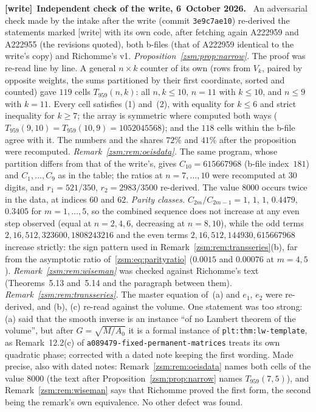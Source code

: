 \documentclass[11pt]{article}
\theoremstyle{definition}\newtheorem{definition}[theorem]{Definition}
\theoremstyle{remark}\newtheorem{remark}[theorem]{Remark}
\newcommand{\file}[1]{\nolinkurl{#1}}
\newenvironment{writenote}[1][]{\par\smallskip\begingroup\small
 \noindent\textbf{[write]}\if\relax\detokenize{#1}\relax\else~\textbf{#1.}\fi\ }%
 {\par\endgroup\smallskip}
\begin{document}
\begin{writenote}[Independent check of the write, 6~October 2026]
An adversarial check made by the intake after the write (commit
\file{3e9c7ae10}) re-derived the statements marked [write] with its own
code, after fetching again A222959 and A222955 (the revisions quoted), both
b-files (that of A222959 identical to the write's copy) and Richomme's v1.
\emph{Proposition~\ref{zsm:prop:narrow}.} The proof was re-read line by
line. A general $n\times k$ counter of its own (rows from $V_k$, paired by
opposite weights, the sums partitioned by their first coordinate, sorted and
counted) gave $119$ cells $T_{959}(n,k)$: all $n,k\le10$, $n=11$ with
$k\le10$, and $n\le9$ with $k=11$. Every cell satisfies (1) and~(2), with
equality for $k\le6$ and strict inequality for $k\ge7$; the array is
symmetric where computed both ways ($T_{959}(9,10)=T_{959}(10,9)=1052045568$);
and the $118$ cells within the b-file agree with it. The numbers and the
shares $72\%$ and $41\%$ after the proposition were recomputed.
\emph{Remark~\ref{zsm:rem:oeisdata}.} The same program, whose partition
differs from that of the write's, gives $C_{10}=615667968$ (b-file
index~$181$) and $C_1,\dots,C_9$ as in the table; the ratios at
$n=7,\dots,10$ were recomputed at $30$ digits, and $r_1=521/350$,
$r_2=2983/3500$ re-derived. The value $8000$ occurs twice in the data, at
indices $60$ and $62$. \emph{Parity classes.} $C_{2m}/C_{2m-1}=1$, $1$, $1$,
$0.4479$, $0.3405$ for $m=1,\dots,5$, so the combined sequence does not
increase at any even step observed (equal at $n=2,4,6$, decreasing at
$n=8,10$), while the odd terms $2,16,512,323600,1808243216$ and the even
terms $2,16,512,144930,615667968$ increase strictly: the sign pattern used
in Remark~\ref{zsm:rem:transseries}(b), far from the asymptotic ratio
of~\eqref{zsm:eq:parityratio} ($0.0015$ and $0.00076$ at $m=4,5$).
\emph{Remark~\ref{zsm:rem:wiseman}} was checked against Richomme's text
(Theorems~5.13 and~5.14 and the paragraph between them).
\emph{Remark~\ref{zsm:rem:transseries}.} The master equation of~(a) and
$e_1$, $e_2$ were re-derived, and (b), (c) re-read against the volume. One
statement was too strong: (a) said that the smooth inverse is an instance
``of no Lambert theorem of the volume'', but after $G=\sqrt{M/A_0}$ it is a
formal instance of \file{plt:thm:lw-template}, as Remark~12.2(c) of
\file{a089479-fixed-permanent-matrices} treats its own quadratic phase;
corrected with a dated note keeping the first wording. Made precise, also
with dated notes: Remark~\ref{zsm:rem:oeisdata} names both cells of the
value $8000$ (the text after Proposition~\ref{zsm:prop:narrow} names
$T_{959}(7,5)$), and Remark~\ref{zsm:rem:wiseman} says that Richomme proved
the first form, the second being the remark's own equivalence. No other
defect was found.
\end{writenote}
\end{document}
